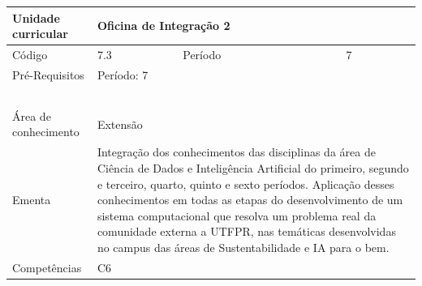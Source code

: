 \clearpage
\newpage

\begin{quadro}[ht!]
  \centering\scriptsize
\caption{Unidade Curricular Oficina de Integração 2}

\begin{tabular}{|p{2.5cm}|p{2.5cm}|p{2.5cm}|p{2.5cm}|p{2.5cm}|}\hline

  Unidade curricular & \multicolumn{4}{p{10cm}|}{ Oficina de Integração 2 }\\\hline
  Código & 7.3 & Período & \multicolumn{2}{p{5cm}|}{ 7 }\\\hline
  Pré-Requisitos & \multicolumn{4}{p{10cm}|}{ Período: 7 } \\\hline
  \cellcolor{blue1}{ CH PRESENCIAL } &
    \cellcolor{blue1}{CH EAD Síncrona} &
    \cellcolor{blue1}{CH EAD Síncrona Mediada} &
    \cellcolor{blue1}{CH EAD Assíncrona} &
    \cellcolor{blue1}{CH APCC} \\\hline
  \cellcolor{blue1}{ 120 } &
    \cellcolor{blue1}{ 0 } &
    \cellcolor{blue1}{ 0 } &
    \cellcolor{blue1}{ 0 } &
    \cellcolor{blue1}{0} \\\hline
  \cellcolor{blue1}{ CH Teórica } &
    \cellcolor{blue1}{CH Prática} &
    \cellcolor{blue1}{CH Humanidades} &
    \cellcolor{blue1}{CH Extensão} &
    \cellcolor{blue1}{CH EAD TOTAL} \\\hline
  \cellcolor{blue1}{ 0 } &
    \cellcolor{blue1}{ 0 } &
    \cellcolor{blue1}{ 0 } &
    \cellcolor{blue1}{ 120 } &
    \cellcolor{blue1}{ 0 } \\\hline
  \cellcolor{blue1}{CARGA-HORÁRIA TOTAL} & \multicolumn{4}{p{10cm}|}{ \cellcolor{blue1}{ 120 } } \\\hline
  Área de conhecimento & \multicolumn{4}{p{10cm}|}{ Extensão } \\\hline
  Ementa & \multicolumn{4}{p{10cm}|}{ Integração dos conhecimentos das disciplinas da área de Ciência de Dados e Inteligência Artificial do primeiro, segundo e terceiro, quarto, quinto e sexto períodos. Aplicação desses conhecimentos em todas as etapas do desenvolvimento de um sistema computacional que resolva um problema real da comunidade externa a UTFPR, nas temáticas desenvolvidas no campus das áreas de Sustentabilidade e IA para o bem. } \\\hline
  Competências & \multicolumn{4}{p{10cm}|}{ C6 } \\\hline


  
	\end{tabular}

\end{quadro}


